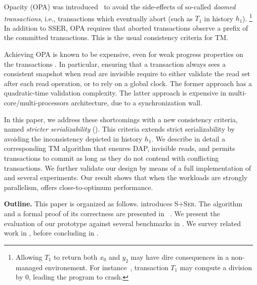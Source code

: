 Opacity (OPA) was introduced~\cite{guerraoui2008correctness} to avoid the side-effects of so-called \emph{doomed transactions}, i.e., transactions which eventually abort (such as $T_1$ in history $h_1$).%
\footnote{  
  Allowing $T_1$ to return both $x_0$ and $y_2$ may have dire consequences in a non-managed environement.
  For instance~\cite{guerraoui2008correctness}, transaction $T_1$ may compute a division by $0$, leading the program to crash.
}
In addition to SSER, OPA requires that aborted transactions observe a prefix of the committed transactions.
This is the usual consistency criteria for TM.

Achieving OPA is known to be expensive, even for weak progress properties on the transactions \cite{}.
In particular, ensuring that a transaction always sees a consistent snapshot when read are invisible require to either validate the read set after each read operation, or to rely on a global clock.
The former approach has a quadratic-time validation complexity.
The latter approach is expensive in multi-core/multi-processors architecture, due to a synchronization wall.

In this paper, we address these shortcomings with a new consistency criteria, named \emph{stricter serializability} (\sser).
This criteria extends strict serializability by avoiding the inconsistency depicted in history $h_1$.
We describe in detail a corresponding TM algorithm that ensures DAP, invisible reads, and permits transactions to commit as long as they do not contend with conflicting transactions.
We further validate our design by means of a full implementation of \sser and several experiments.
Our result shows that when the workloads are strongly parallelism, \sser offers close-to-optimum performance.

\textbf{Outline.}
This paper is organized as follows.
 introduces \textsc{S+Ser}.
The algorithm and a formal proof of its correctness are presented in ~.
We present the evaluation of our prototype against several benchmarks in .
We survey related work in , before concluding in .
